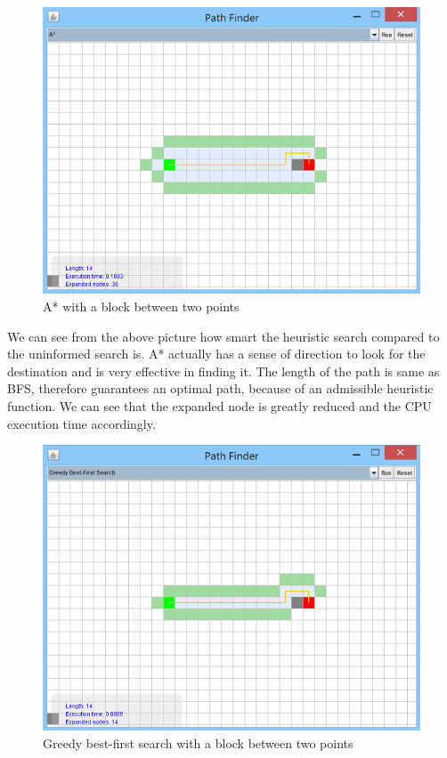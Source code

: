 \documentclass[a4paper]{article}
\begin{document}
\begin{figure}[h!]
  \centering
    \includegraphics[scale=.9]{images/A1.png}
  \caption{A* with a block between two points}
\end{figure}

\noindent We can see from the above picture how smart the heuristic search compared to the uninformed search is. A* actually has a sense of direction to look for the destination and is very effective in finding it. The length of the path is same as BFS, therefore guarantees an optimal path, because of an admissible heuristic function. We can see that the expanded node is greatly reduced and the CPU execution time accordingly. \\

\begin{figure}[h!]
  \centering
    \includegraphics[scale=.9]{images/greedy1.png}
  \caption{Greedy best-first search with a block between two points}
\end{figure}
\end{document}
